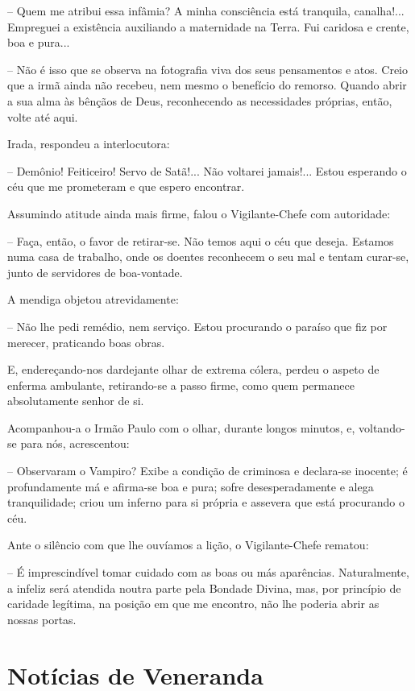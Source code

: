 \documentclass[portuguese,12pt,a4paper]{scrbook}
\begin{document}
	– Quem me atribui essa infâmia? A minha consciência está tranquila, canalha!... Empreguei a existência auxiliando a maternidade na Terra. Fui caridosa e crente, boa e pura...
	
	– Não é isso que se observa na fotografia viva dos seus pensamentos e atos. Creio que a irmã ainda não recebeu, nem mesmo o benefício do remorso. Quando abrir a sua alma às bênçãos de Deus, reconhecendo as necessidades próprias, então, volte até aqui.
	
	Irada, respondeu a interlocutora:
	
	– Demônio! Feiticeiro! Servo de Satã!... Não voltarei jamais!... Estou esperando o céu que me prometeram e que espero encontrar.
	
	
	Assumindo atitude ainda mais firme, falou o Vigilante-Chefe com autoridade:
	
	– Faça, então, o favor de retirar-se. Não temos aqui o céu que deseja. Estamos numa casa de trabalho, onde os doentes reconhecem o seu mal e tentam curar-se, junto de servidores de boa-vontade.
	
	A mendiga objetou atrevidamente:
	
	– Não lhe pedi remédio, nem serviço. Estou procurando o paraíso que fiz por merecer, praticando boas obras.
	
	E, endereçando-nos dardejante olhar de extrema cólera, perdeu o aspeto de enferma ambulante, retirando-se a passo firme, como quem permanece absolutamente senhor de si.
	
	Acompanhou-a o Irmão Paulo com o olhar, durante longos minutos, e, voltando-se para nós, acrescentou:
	
	– Observaram o Vampiro? Exibe a condição de criminosa e declara-se inocente; é profundamente má e afirma-se boa e pura; sofre desesperadamente e alega tranquilidade; criou um inferno para si própria e assevera que está procurando o céu.
	
	Ante o silêncio com que lhe ouvíamos a lição, o Vigilante-Chefe rematou:
	
	– É imprescindível tomar cuidado com as boas ou más aparências. Naturalmente, a infeliz será atendida noutra parte pela Bondade Divina, mas, por princípio de caridade legítima, na posição em que me encontro, não lhe poderia abrir as nossas portas.
	
	
	\chapter{Notícias de Veneranda}
	
\end{document}
